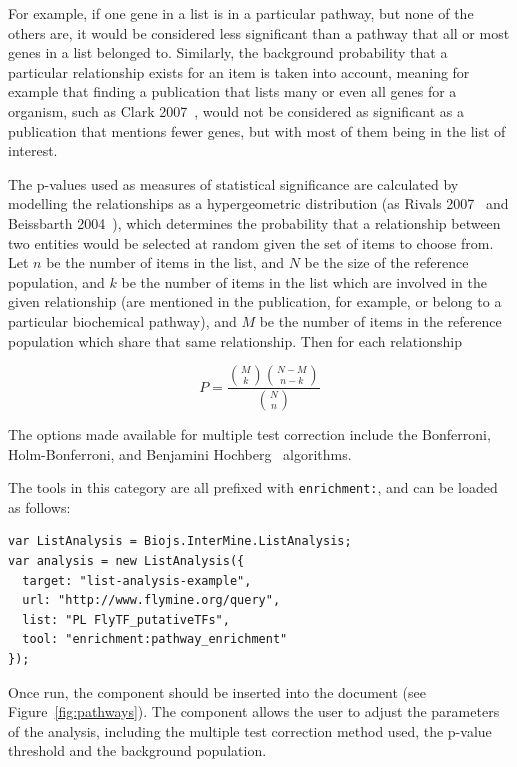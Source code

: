 \documentclass[10pt,a4paper,twocolumn]{article}
\begin{document}
For example, if one gene in a list is in a particular pathway, but none of the
others are, it would be considered less significant than a pathway that all or
most genes in a list belonged to. Similarly, the background probability that a
particular relationship exists for an item is taken into account, meaning for
example that finding a publication that lists many or even all genes for a
organism, such as Clark 2007~\cite{Clark:2007}, would not be considered as
significant as a publication that mentions fewer genes, but with most of them
being in the list of interest.

The p-values used as measures of statistical significance are calculated by
modelling the relationships as a hypergeometric distribution (as Rivals
2007~\cite{rivals} and Beissbarth 2004~\cite{beissbarth}), which determines the
probability that a relationship between two entities would be selected at random
given the set of items to choose from. Let $n$ be the number of items in the
list, and $N$ be the size of the reference population, and $k$ be the number of
items in the list which are involved in the given relationship (are mentioned in
the publication, for example, or belong to a particular biochemical pathway),
and $M$ be the number of items in the reference population which share that
same relationship. Then for each relationship

$$P = \frac{{M \choose k} {N-M \choose n-k}}{{N \choose n}}$$
      
The options made available for multiple test correction include the Bonferroni,
Holm-Bonferroni, and Benjamini Hochberg~\cite{benjamini} algorithms.

The tools in this category are all prefixed with \texttt{enrichment:}, and can
be loaded as follows:

\begin{lstlisting}[caption={Loading an enrichment list analysis tool.},label={code:load-enrichment}]
var ListAnalysis = Biojs.InterMine.ListAnalysis;
var analysis = new ListAnalysis({
  target: "list-analysis-example",
  url: "http://www.flymine.org/query",
  list: "PL FlyTF_putativeTFs",
  tool: "enrichment:pathway_enrichment"
});
\end{lstlisting}

Once run, the component should be inserted into the document (see
Figure~\ref{fig:pathways}). The
component allows the user to adjust the parameters of the analysis, including the multiple
test correction method used, the p-value threshold and the background population.
\end{document}

